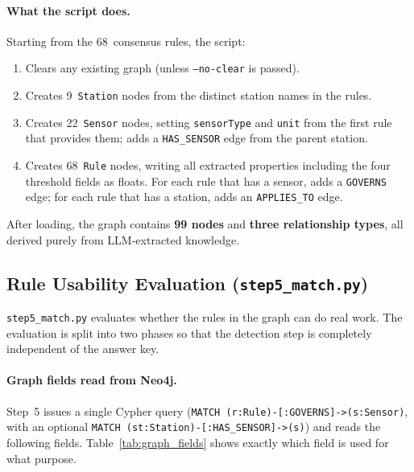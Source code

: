 ﻿\documentclass[11pt]{article}
\begin{document}
\paragraph{What the script does.}
Starting from the 68~consensus rules, the script:
\begin{enumerate}
  \item Clears any existing graph (unless \texttt{--no-clear} is passed).
  \item Creates 9~\texttt{Station} nodes from the distinct station names in the
        rules.
  \item Creates 22~\texttt{Sensor} nodes, setting \texttt{sensorType} and
        \texttt{unit} from the first rule that provides them; adds a
        \texttt{HAS\_SENSOR} edge from the parent station.
  \item Creates 68~\texttt{Rule} nodes, writing all extracted properties
        including the four threshold fields as floats.
        For each rule that has a sensor, adds a \texttt{GOVERNS} edge; for
        each rule that has a station, adds an \texttt{APPLIES\_TO} edge.
\end{enumerate}
After loading, the graph contains \textbf{99 nodes} and \textbf{three relationship
types}, all derived purely from LLM-extracted knowledge.

\subsection{Rule Usability Evaluation (\texttt{step5\_match.py})}
\label{sec:step5}

\texttt{step5\_match.py} evaluates whether the rules in the graph can do
real work.  The evaluation is split into two phases so that the detection step
is completely independent of the answer key.

\paragraph{Graph fields read from Neo4j.}
Step~5 issues a single Cypher query
(\texttt{MATCH (r:Rule)-[:GOVERNS]->(s:Sensor)}, with an optional
\texttt{MATCH (st:Station)-[:HAS\_SENSOR]->(s)}) and reads the following
fields.  Table~\ref{tab:graph_fields} shows exactly which field is used for
what purpose.
\end{document}

